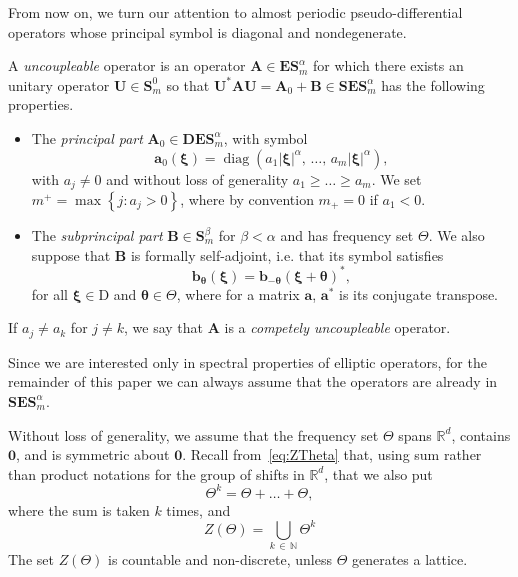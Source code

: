 \documentclass[AHL,Unicode,longabstracts,published]{cedram}
\DeclareMathOperator{\diag}{diag}
\newcommand{\RD}{\mathrm{D}}
\newcommand{\R}{\mathbb R}
\newcommand{\N}{\mathbb N}
\newcommand{\btheta}{\boldsymbol \theta}
\newcommand{\bxi}{\boldsymbol \xi}
\newcommand{\ba}{\mathbf a}
\newcommand{\BA}{\mathbf A}
\newcommand{\BB}{\mathbf B}
\newcommand{\BD}{\mathbf D}
\newcommand{\BE}{\mathbf E}
\newcommand{\BS}{\mathbf S}
\newcommand{\BU}{\mathbf U}
\newcommand{\bbb}{\mathbf b}
\newcommand{\pd}{uncoupleable}
\newcommand{\mpu}{competely uncoupleable}
\newcommand{\abs}[1]{\left\lvert #1 \right\rvert}
\newcommand{\set}[1]{\left\{ #1 \right\}}
\begin{document}
From now on, we turn our attention to almost periodic pseudo-differential operators whose principal symbol is diagonal and nondegenerate.
\begin{defi}
A \emph{\pd} operator is an operator $\BA \in \BE\BS_m^\alpha$ for which there exists an unitary operator $\BU \in \BS_m^0$ so that $\BU^* \BA \BU = \BA_0 + \BB \in
\BS\BE\BS_m^\alpha$ has the following properties.
\begin{itemize}
\item The \emph{principal part} $\BA_0 \in \BD \BE \BS_m^\alpha$, with symbol
\begin{equation}\label{eq:defh0}
\ba_0(\bxi) = \diag\left(a_1 \abs \bxi^\alpha,\,\dotsc,\,a_m \abs
\bxi^\alpha\right),
\end{equation}
with $a_j \ne 0$ and without loss of generality $a_1 \ge \dotso \ge a_m$. We set $m^+ = \max\set{j : a_j > 0}$, where by convention $m_+ = 0$ if $a_1 < 0$.
\item The \emph{subprincipal part} $\BB \in \BS_m^\beta$ for $\beta < \alpha$ and has frequency set $\Theta$. We also suppose that $\BB$ is formally self-adjoint, i.e. that its symbol satisfies
\begin{equation}\label{eq:selfadjb}
\bbb_{\btheta}(\bxi) = \bbb_{-\btheta}(\bxi + \btheta)^*,
\end{equation}
for all $\bxi \in \RD$ and $\btheta \in \Theta$, where for a matrix $\ba$, $\ba^*$ is its conjugate transpose.
\end{itemize}
If $a_j \ne a_k$ for $j \ne k$, we say that $\BA$ is a \emph{\mpu} operator.
\end{defi}

\begin{rema}
Since we are interested only in spectral properties of elliptic operators, for the remainder of this paper we can always assume that the operators are already in $\BS\BE\BS_m^\alpha$.
\end{rema}

Without loss of generality, we assume that the frequency set $\Theta$ spans $\R^d$, contains $\mathbf 0$, and is symmetric about $\mathbf 0$. Recall from~\eqref{eq:ZTheta} that, using sum rather than product notations for the group of shifts in $\R^d$, that we also put
\begin{equation}\label{eq:thetasum}
\Theta^k = \Theta + \dotso + \Theta,
\end{equation}
where the sum is taken $k$ times, and
\begin{equation}\label{eq:ZTh}
Z(\Theta) = \bigcup_{k\,\in\,\N}
\Theta^k
\end{equation}
The set $Z(\Theta)$ is countable and non-discrete, unless $\Theta$ generates a lattice.
\end{document}
